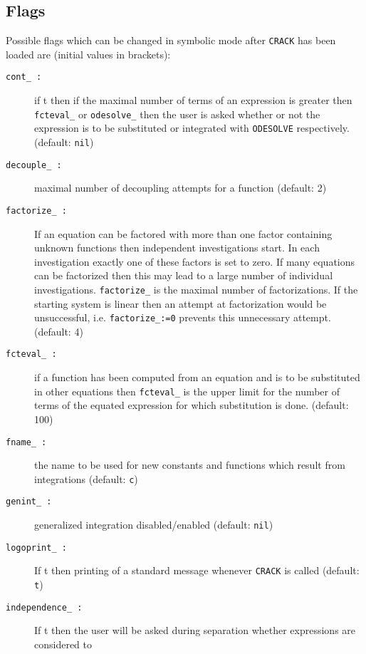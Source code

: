 \subsection{Flags}
Possible flags which can be changed in symbolic mode
after {\tt CRACK} has been loaded are (initial values in brackets):
\begin{description}
\item[{\tt cont\_ :}] if t then if the maximal number of terms of an expression
             is greater then {\tt fcteval\_} or {\tt odesolve\_} then
             the user is asked
             whether or not the expression is to be substituted or integrated
             with {\tt ODESOLVE} respectively.  (default: {\tt nil})
\item[{\tt decouple\_ :}] maximal number of decoupling attempts for a
             function (default: 2)
\item[{\tt factorize\_ :}] If an equation can be factored with more than one
             factor
             containing unknown functions then independent investigations
             start. In each investigation exactly one of these factors is set
             to zero. If
             many equations can be factorized then this may lead to a large
             number of individual investigations. {\tt factorize\_} is the
             maximal number
             of factorizations. If the starting system is linear then
             an attempt at factorization would be unsuccessful, i.e.
             {\tt factorize\_:=0} prevents this unnecessary
             attempt. (default: 4)
\item[{\tt fcteval\_ :}] if a function has been computed from an equation and
             is to
             be substituted in other equations then {\tt fcteval\_} is the
             upper limit for the number of terms of the equated expression
             for which substitution is done. (default: 100)
\item[{\tt fname\_ :}] the name to be used for new constants and functions
             which result from integrations  (default: {\tt c})
\item[{\tt genint\_ :}] generalized integration disabled/enabled
             (default: {\tt nil})
\item[{\tt logoprint\_ :}] If t then printing of a standard message whenever
             {\tt CRACK} is called (default: {\tt t})
\item[{\tt independence\_ :}] If t then the user will be asked during
             separation whether expressions are considered to

\end{description}

